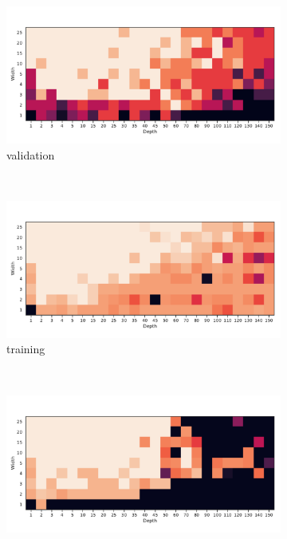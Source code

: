\begin{figure}
\begin{subfigure}[b]{0.3\textwidth}
        \includegraphics[width=\textwidth]{img/moons_grid/val-acc-sep-up-0-0001.pdf}
        \caption{\SepUnitPoint validation}
        \label{fig:moons_grid_up}
    \end{subfigure}
    ~ %
      \\
    \begin{subfigure}[b]{0.3\textwidth}
        \includegraphics[width=\textwidth]{img/moons_grid/acc-sep-u-0-0001.pdf}
        \caption{\SepUnit training}
        \label{fig:moons_grid_u}
    \end{subfigure}
    ~ %
    \centering
    \begin{subfigure}[b]{0.3\textwidth}
        \includegraphics[width=\textwidth]{img/moons_grid/acc-sep-p-0-0001.pdf}

\end{subfigure}
\end{figure}
